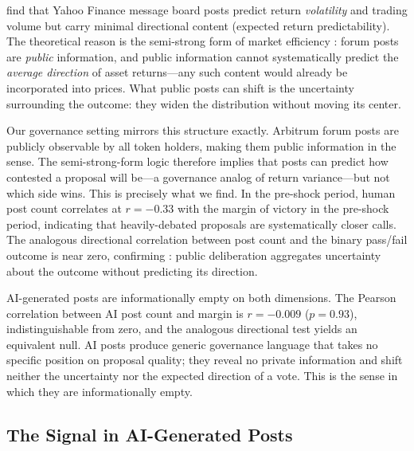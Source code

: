 \documentclass[12pt]{article}
\newcommand{\FloatBarrier}{\par}
\begin{document}
\citet{antweiler2004} find that Yahoo Finance message board posts predict return \emph{volatility} and trading volume but carry minimal directional content (expected return predictability). The theoretical reason is the semi-strong form of market efficiency \citep{fama1970}: forum posts are \emph{public} information, and public information cannot systematically predict the \emph{average direction} of asset returns---any such content would already be incorporated into prices. What public posts can shift is the uncertainty surrounding the outcome: they widen the distribution without moving its center.

Our governance setting mirrors this structure exactly. Arbitrum forum posts are publicly observable by all token holders, making them public information in the \citet{fama1970} sense. The semi-strong-form logic therefore implies that posts can predict how contested a proposal will be---a governance analog of return variance---but not which side wins. This is precisely what we find. In the pre-shock period, human post count correlates at $r = -0.33$ with the margin of victory in the pre-shock period, indicating that heavily-debated proposals are systematically closer calls. The analogous directional correlation between post count and the binary pass/fail outcome is near zero, confirming \citet{antweiler2004}: public deliberation aggregates uncertainty about the outcome without predicting its direction.

AI-generated posts are informationally empty on both dimensions. The Pearson correlation between AI post count and margin is $r = -0.009$ ($p = 0.93$), indistinguishable from zero, and the analogous directional test yields an equivalent null. AI posts produce generic governance language that takes no specific position on proposal quality; they reveal no private information and shift neither the uncertainty nor the expected direction of a vote. This is the sense in which they are informationally empty.

\FloatBarrier
\subsection{The Signal in AI-Generated Posts}
\label{sec:ecosystem}
\end{document}
